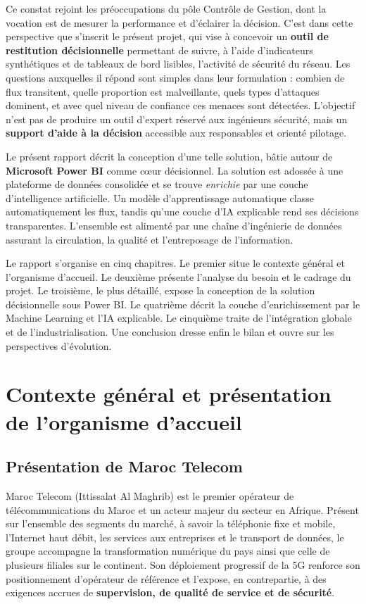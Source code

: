 \documentclass[12pt,a4paper,oneside]{report}
\begin{document}
Ce constat rejoint les préoccupations du pôle Contrôle de Gestion, dont la vocation est de mesurer la performance et d'éclairer la décision. C'est dans cette perspective que s'inscrit le présent projet, qui vise à concevoir un \textbf{outil de restitution décisionnelle} permettant de suivre, à l'aide d'indicateurs synthétiques et de tableaux de bord lisibles, l'activité de sécurité du réseau. Les questions auxquelles il répond sont simples dans leur formulation : combien de flux transitent, quelle proportion est malveillante, quels types d'attaques dominent, et avec quel niveau de confiance ces menaces sont détectées. L'objectif n'est pas de produire un outil d'expert réservé aux ingénieurs sécurité, mais un \textbf{support d'aide à la décision} accessible aux responsables et orienté pilotage.

Le présent rapport décrit la conception d'une telle solution, bâtie autour de \textbf{Microsoft Power BI} comme cœur décisionnel. La solution est adossée à une plateforme de données consolidée et se trouve \emph{enrichie} par une couche d'intelligence artificielle. Un modèle d'apprentissage automatique classe automatiquement les flux, tandis qu'une couche d'IA explicable rend ses décisions transparentes. L'ensemble est alimenté par une chaîne d'ingénierie de données assurant la circulation, la qualité et l'entreposage de l'information.

Le rapport s'organise en cinq chapitres. Le premier situe le contexte général et l'organisme d'accueil. Le deuxième présente l'analyse du besoin et le cadrage du projet. Le troisième, le plus détaillé, expose la conception de la solution décisionnelle sous Power BI. Le quatrième décrit la couche d'enrichissement par le Machine Learning et l'IA explicable. Le cinquième traite de l'intégration globale et de l'industrialisation. Une conclusion dresse enfin le bilan et ouvre sur les perspectives d'évolution.

\chapter{Contexte général et présentation de l'organisme d'accueil}

\section{Présentation de Maroc Telecom}
Maroc Telecom (Ittissalat Al Maghrib) est le premier opérateur de télécommunications du Maroc et un acteur majeur du secteur en Afrique. Présent sur l'ensemble des segments du marché, à savoir la téléphonie fixe et mobile, l'Internet haut débit, les services aux entreprises et le transport de données, le groupe accompagne la transformation numérique du pays ainsi que celle de plusieurs filiales sur le continent. Son déploiement progressif de la 5G renforce son positionnement d'opérateur de référence et l'expose, en contrepartie, à des exigences accrues de \textbf{supervision, de qualité de service et de sécurité}.
\end{document}
